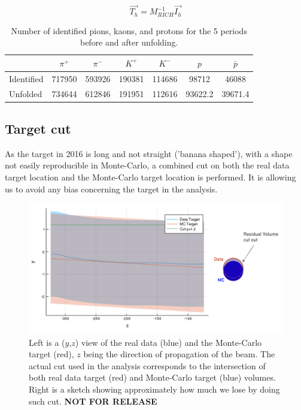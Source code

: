 \documentclass[letterpaper,12pt]{article}
\begin{document}
\begin{equation}
  \overrightarrow{T_h} = M^{-1}_{RICH}\overrightarrow{I_h}
	\label{richmat}
\end{equation}

\begin{table}[!h]
  \caption{\label{HadNum} Number of identified pions, kaons, and protons for the 5 periods before and after unfolding.}
  \centering
  \begin{tabular}{lcccccc}
    \hline
     & $\pi^+$ & $\pi^-$ & $K^+$ & $K^-$ & $p$ & $\bar{p}$ \\
    \hline
    Identified & 717950 & 593926 & 190381 & 114686 & 98712 & 46088 \\
    Unfolded & 734644 & 612846 & 191951 & 112616 & 93622.2 & 39671.4 \\
    \hline
  \end{tabular}
\end{table}

\subsection{Target cut}

As the target in 2016 is long and not straight ('banana shaped'), with a shape not easily reproducible in Monte-Carlo, a combined cut on both the real data target location and the Monte-Carlo target location is performed. It is allowing us to avoid any bias concerning the target in the analysis.

\begin{figure}[!h]
	\includegraphics[scale=0.4]{./gfx/Target.png}
	\caption{Left is a ($y$,$z$) view of the real data (blue) and the Monte-Carlo target (red), $z$ being the direction of propagation of the beam. The actual cut used in the analysis corresponds to the intersection of both real data target (red) and Monte-Carlo target (blue) volumes. Right is a sketch showing approximately how much we lose by doing such cut. \textbf{NOT FOR RELEASE}}
	\label{Target}
\end{figure}
\end{document}
